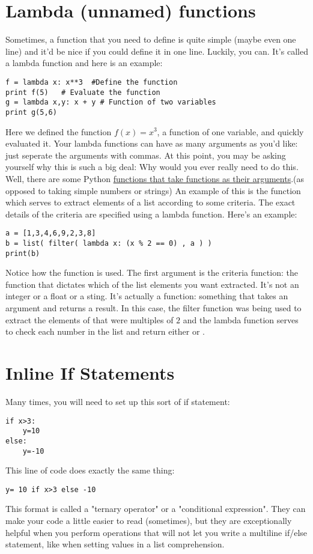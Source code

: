 \section{Lambda (unnamed) functions}
Sometimes, a function that you need to
define is quite simple (maybe even one line) and it'd be nice if you
could define it in one line.  Luckily, you can.  It's
called a lambda function and here is an example:
\begin{Verbatim}
f = lambda x: x**3  #Define the function
print f(5)   # Evaluate the function
g = lambda x,y: x + y # Function of two variables
print g(5,6)
\end{Verbatim}
Here we defined the function $f(x) = x^3$, a function of one variable,
and quickly evaluated it.  Your lambda functions can have as many
arguments as you'd like: just seperate the arguments with commas.  At
this point, you may be asking yourself why this is such a big deal:
Why would you ever really need to do this.  Well, there are some
Python \underline{functions that take functions as their
  arguments}.(as opposed
to taking simple numbers or strings) An example of this is the
 function which serves to extract elements of a list
according to some criteria.  The exact details of the criteria are
specified using a lambda function.  Here's an example:
\begin{Verbatim}
a = [1,3,4,6,9,2,3,8]
b = list( filter( lambda x: (x % 2 == 0) , a ) )
print(b)
\end{Verbatim}
Notice how the  function is used.  The first argument
is the criteria function: the function that dictates which of the list
elements you want extracted. It's not an integer or a float or a
sting.  It's actually a function: something that takes an argument and
returns a result.  In this case, the filter function was being used to
extract the elements of  that were multiples of $2$ and the
lambda function serves to check each number in the list and return
either  or .

\section{Inline If Statements}
Many times, you will need to set up this sort of if statement:
\begin{Verbatim}
if x>3:
    y=10
else:
    y=-10
\end{Verbatim}
This line of code does exactly the same thing:
\begin{Verbatim}
y= 10 if x>3 else -10
\end{Verbatim}
This format is called a "ternary operator" or a "conditional expression". They can make your code a little easier to read (sometimes), but they are exceptionally helpful when you perform operations that will not let you write a multiline if/else statement, like when setting values in a list comprehension.

